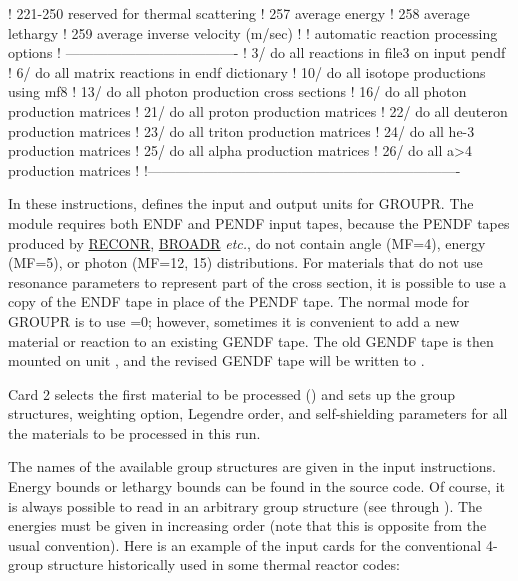 \begin{ccode}
   !     221-250      reserved for thermal scattering
   !     257          average energy
   !     258          average lethargy
   !     259          average inverse velocity (m/sec)
   !
   !     automatic reaction processing options
   !     -------------------------------------
   !        3/        do all reactions in file3 on input pendf
   !        6/        do all matrix reactions in endf dictionary
   !       10/        do all isotope productions using mf8
   !       13/        do all photon production cross sections
   !       16/        do all photon production matrices
   !       21/        do all proton production matrices
   !       22/        do all deuteron production matrices
   !       23/        do all triton production matrices
   !       24/        do all he-3 production matrices
   !       25/        do all alpha production matrices
   !       26/        do all a>4 production matrices
   !
   !-------------------------------------------------------------------

\end{ccode}
\normalsize

In these instructions,  defines the input and output units
for GROUPR.  The module requires both ENDF and PENDF input tapes,
because the PENDF tapes produced by
\hyperlink{sRECONRhy}{RECONR},
\hyperlink{sBROADRhy}{BROADR} {\it etc.}, do not
contain angle (MF=4),
energy (MF=5), or photon (MF=12, 15) distributions.  For materials
that do not use resonance parameters to represent part of the
cross section, it is possible to use a copy of the ENDF tape in place
of the PENDF tape.  The normal mode for GROUPR is to use =0;
however, sometimes it is convenient to add a new material or reaction to
an existing GENDF tape.  The old GENDF tape is then mounted on unit
, and the revised GENDF tape will be written to .

Card 2 selects the first material to be processed () and sets
up the group structures,
weighting option, Legendre order, and
self-shielding parameters for all the materials
to be processed in this run.

The names of the available group structures are given in the input
instructions. Energy bounds or lethargy bounds can be found in the
source code.  Of course, it is always possible to read in an arbitrary
group structure (see  through ).  The energies
must be given in increasing order (note that this is opposite from the
usual convention).  Here is an example of the input cards for the
conventional 4-group structure historically used in some thermal
reactor codes:

